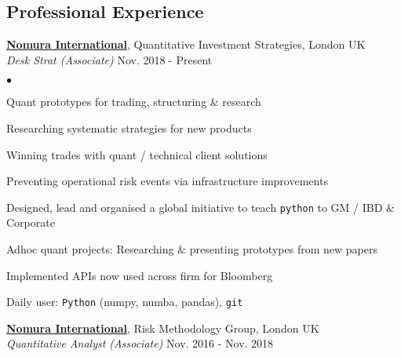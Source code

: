 \documentclass[margin, line]{res}
\newcommand{\Nomura}{http://www.nomura.com}
\newenvironment{list2}{
	\begin{list}{$\bullet$}{%
		\setlength{\itemsep}{0in}
		\setlength{\parsep}{0in} \setlength{\parskip}{0in}
		\setlength{\topsep}{0in} \setlength{\partopsep}{0in}
		\setlength{\leftmargin}{0.2in}}}{\end{list}}
\begin{document}
\begin{resume}
\section{\sc Professional Experience}

{\bf \href{\Nomura}{Nomura International}}, Quantitative Investment Strategies, London UK \\
\vspace{-.3cm}
{\em Desk Strat (Associate)}
    \hfill{Nov. 2018 - Present}\\

\begin{list2}
\item Quant prototypes for trading, structuring \& research
\item Researching systematic strategies for new products
\item Winning trades with quant / technical client solutions
\item Preventing operational risk events via infrastructure improvements
\item Designed, lead and organised a global initiative to teach \verb|python| to GM / IBD \& Corporate
\item Adhoc quant projects: Researching \& presenting prototypes from new papers
\item Implemented APIs now used across firm for Bloomberg
\item Daily user: \verb|Python| (numpy, numba, pandas), \verb|git|
\end{list2}

{\bf \href{\Nomura}{Nomura International}},
	Risk Methodology Group, London UK \\
\vspace{-.3cm}
{\em Quantitative Analyst (Associate)}
	\hfill{Nov. 2016 - Nov. 2018}\\


\end{resume}
\end{document}
